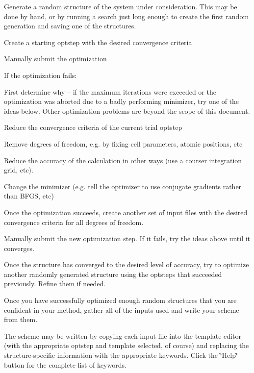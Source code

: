 \begin{DoxyEnumerate}
\item Generate a random structure of the system under consideration. This may be done by hand, or by running a search just long enough to create the first random generation and saving one of the structures.
\item Create a starting optstep with the desired convergence criteria
\item Manually submit the optimization
\item If the optimization fails\+:
\begin{DoxyEnumerate}
\item First determine why -- if the maximum iterations were exceeded or the optimization was aborted due to a badly performing minimizer, try one of the ideas below. Other optimization problems are beyond the scope of this document.
\item Reduce the convergence criteria of the current trial optstep
\item Remove degrees of freedom, e.\+g. by fixing cell parameters, atomic positions, etc
\item Reduce the accuracy of the calculation in other ways (use a courser integration grid, etc).
\item Change the minimizer (e.\+g. tell the optimizer to use conjugate gradients rather than B\+F\+G\+S, etc)
\end{DoxyEnumerate}
\item Once the optimization succeeds, create another set of input files with the desired convergence criteria for all degrees of freedom.
\item Manually submit the new optimization step. If it fails, try the ideas above until it converges.
\item Once the structure has converged to the desired level of accuracy, try to optimize another randomly generated structure using the optsteps that succeeded previously. Refine them if needed.
\item Once you have successfully optimized enough random structures that you are confident in your method, gather all of the inputs used and write your scheme from them.
\end{DoxyEnumerate}

The scheme may be written by copying each input file into the template editor (with the appropriate optstep and template selected, of course) and replacing the structure-\/specific information with the appropriate keywords. Click the \char`\"{}\+Help\char`\"{} button for the complete list of keywords.


